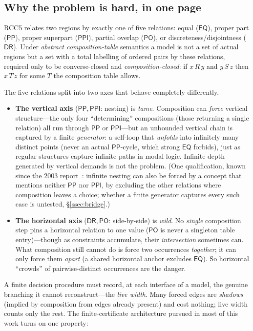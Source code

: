 \documentclass[11pt]{article}
\newcommand{\DR}{\mathsf{DR}}
\newcommand{\PO}{\mathsf{PO}}
\newcommand{\PP}{\mathsf{PP}}
\newcommand{\PPI}{\mathsf{PPI}}
\newcommand{\EQ}{\mathsf{EQ}}
\theoremstyle{plain}
\theoremstyle{definition}
\begin{document}
\subsection{Why the problem is hard, in one page}
\label{ssec:whyhard}

RCC5 relates two regions by exactly one of five relations: equal ($\EQ$),
proper part ($\PP$), proper superpart ($\PPI$), partial overlap ($\PO$),
or discreteness/disjointness ($\DR$). Under \emph{abstract
composition-table} semantics a model is not a set of actual regions but a
set with a total labelling of ordered pairs by these relations, required
only to be converse-closed and \emph{composition-closed}: if $x\,R\,y$
and $y\,S\,z$ then $x\,T\,z$ for some $T$ the composition table allows.

The five relations split into two axes that behave completely
differently.
\begin{itemize}
  \item \textbf{The vertical axis} ($\PP,\PPI$: nesting) is \emph{tame}.
    Composition can \emph{force} vertical structure---the only four
    ``determining'' compositions (those returning a single relation) all
    run through $\PP$ or $\PPI$---but an unbounded vertical chain is captured
    by a finite \emph{generator}: a self-loop that \emph{unfolds} into
    infinitely many distinct points (never an actual $\PP$-cycle, which
    strong $\EQ$ forbids), just as regular structures capture infinite paths
    in modal logic. Infinite depth generated by vertical demands is not the
    problem. (One qualification, known since the 2003
    report~\cite{Wessel2003}: infinite nesting can also be forced by a concept
    that mentions neither $\PP$ nor $\PPI$, by excluding the other relations
    where composition leaves a choice; whether a finite generator captures
    every such case is untested, \S\ref{ssec:bridge}.)
  \item \textbf{The horizontal axis} ($\DR,\PO$: side-by-side) is
    \emph{wild}. No \emph{single} composition step pins a horizontal
    relation to one value ($\PO$ is never a singleton table entry)---though
    as constraints accumulate, their \emph{intersection} sometimes can. What
    composition still cannot do is force two occurrences \emph{together}; it
    can only force them \emph{apart} (a shared horizontal anchor excludes
    $\EQ$). So horizontal ``crowds'' of pairwise-distinct occurrences are
    the danger.
\end{itemize}

A finite decision procedure must record, at each interface of a model,
the genuine branching it cannot reconstruct---the \emph{live width}. Many
forced edges are \emph{shadows} (implied by composition from edges
already present) and cost nothing; live width counts only the rest. The
finite-certificate architecture pursued in most of this work turns on one
property:
\end{document}

